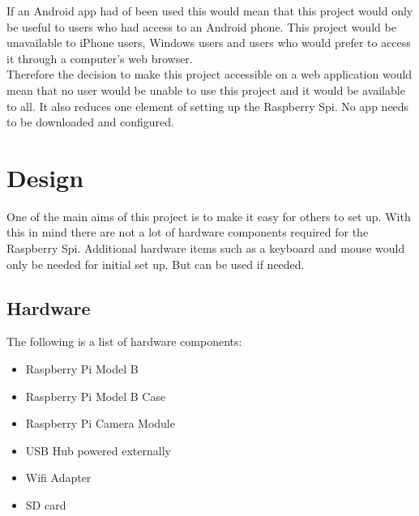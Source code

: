 \documentclass[]{report}
\begin{document}
If an Android app had of been used this would mean that this project would only be useful to users who had access to an Android phone. This project would be unavailable to iPhone users, Windows users and users who would prefer to access it through a computer's web browser.\\

Therefore the decision to make this project accessible on a web application would mean that no user would be unable to use this project and it would be available to all. It also reduces one element of setting up the Raspberry Spi. No app needs to be downloaded and configured.\\

% 
\chapter{Design}
\label{ch:design}
	One of the main aims of this project is to make it easy for others to set up. With this in mind there are not a lot of hardware components required for the Raspberry Spi. Additional hardware items such as a keyboard and mouse would only be needed for initial set up. But can be used if needed. \\
	
\section{Hardware}	
\label{sec:hardware}

The following is a list of hardware components:\\
\begin{itemize}
  \item Raspberry Pi Model B\\
  \item Raspberry Pi Model B Case\\
  \item Raspberry Pi Camera Module\\
  \item USB Hub powered externally\\
  \item Wifi Adapter\\
  \item SD card\\
\end{itemize} 
\end{document}
